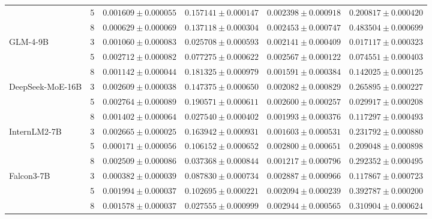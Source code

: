 \begin{table}[t]
\begin{tabular}{llcccc}
& 5
& $0.001609 \pm 0.000055$
& $0.157141 \pm 0.000147$
& $0.002398 \pm 0.000918$
& $0.200817 \pm 0.000420$ \\
& 8
& $0.000629 \pm 0.000069$
& $0.137118 \pm 0.000304$
& $0.002453 \pm 0.000747$
& $0.483504 \pm 0.000699$ \\
\midrule
GLM-4-9B
& 3
& $0.001060 \pm 0.000083$
& $0.025708 \pm 0.000593$
& $0.002141 \pm 0.000409$
& $0.017117 \pm 0.000323$ \\
& 5
& $0.002712 \pm 0.000082$
& $0.077275 \pm 0.000622$
& $0.002567 \pm 0.000122$
& $0.074551 \pm 0.000403$ \\
& 8
& $0.001142 \pm 0.000044$
& $0.181325 \pm 0.000979$
& $0.001591 \pm 0.000384$
& $0.142025 \pm 0.000125$ \\
\midrule
DeepSeek-MoE-16B
& 3
& $0.002609 \pm 0.000038$
& $0.147375 \pm 0.000650$
& $0.002082 \pm 0.000829$
& $0.265895 \pm 0.000227$ \\
& 5
& $0.002764 \pm 0.000089$
& $0.190571 \pm 0.000611$
& $0.002600 \pm 0.000257$
& $0.029917 \pm 0.000208$ \\
& 8
& $0.001402 \pm 0.000064$
& $0.027540 \pm 0.000402$
& $0.001993 \pm 0.000376$
& $0.117297 \pm 0.000493$ \\
\midrule
InternLM2-7B
& 3
& $0.002665 \pm 0.000025$
& $0.163942 \pm 0.000931$
& $0.001603 \pm 0.000531$
& $0.231792 \pm 0.000880$ \\
& 5
& $0.000171 \pm 0.000056$
& $0.106152 \pm 0.000652$
& $0.002800 \pm 0.000651$
& $0.209048 \pm 0.000898$ \\
& 8
& $0.002509 \pm 0.000086$
& $0.037368 \pm 0.000844$
& $0.001217 \pm 0.000796$
& $0.292352 \pm 0.000495$ \\
\midrule
Falcon3-7B
& 3
& $0.000382 \pm 0.000039$
& $0.087830 \pm 0.000734$
& $0.002887 \pm 0.000966$
& $0.117867 \pm 0.000723$ \\
& 5
& $0.001994 \pm 0.000037$
& $0.102695 \pm 0.000221$
& $0.002094 \pm 0.000239$
& $0.392787 \pm 0.000200$ \\
& 8
& $0.001578 \pm 0.000037$
& $0.027555 \pm 0.000999$
& $0.002944 \pm 0.000565$
& $0.310904 \pm 0.000624$ \\
\bottomrule
\end{tabular}
\end{table}


